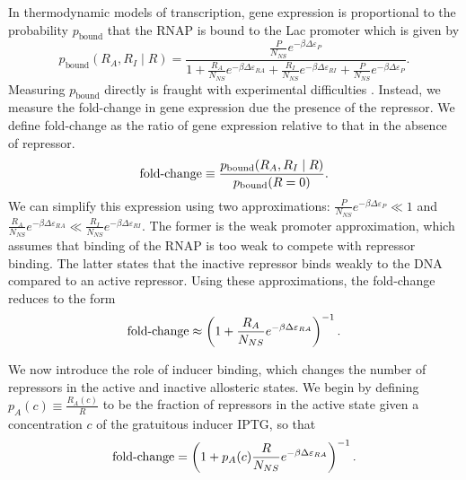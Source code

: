In thermodynamic models of transcription, gene expression is proportional to the probability $p_{\text{bound}}$ that the RNAP is bound to the Lac promoter which is given by
\begin{equation}\label{eq2}
p_{\text{bound}}(R_A, R_I \mid R)=\frac{\frac{P}{N_{NS}}e^{-\beta  \Delta\varepsilon_{P}}}{1+\frac{R_A}{N_{NS}}e^{-\beta \Delta\varepsilon_{RA}}+\frac{R_I}{N_{NS}}e^{-\beta  \Delta\varepsilon_{RI}}+\frac{P}{N_{NS}}e^{-\beta\Delta\varepsilon_{P}}}.
\end{equation}
Measuring $p_{\text{bound}}$ directly is fraught with experimental difficulties
\cite{Bintu2005}. Instead, we measure the fold-change in gene expression due the presence of the repressor. We define fold-change as the ratio of gene
expression relative to that in the absence of repressor.
\begin{equation}\label{eq3}
\operatorname{fold-change}\equiv \frac{p_{\text{bound}}(R_A, R_I \mid R)}{p_{\text{bound}}(R = 0)}.
\end{equation}
We can simplify this expression using two approximations:
$\frac{P}{N_{NS}}e^{-\beta\Delta\varepsilon_{P}}\ll 1$ and
$\frac{R_A}{N_{NS}}e^{-\beta \Delta\varepsilon_{RA}} \ll \frac{R_I}{N_{NS}}e^{-\beta \Delta\varepsilon_{RI}}$. The former is the weak promoter
approximation, which assumes that binding of the RNAP is too weak to compete with
repressor binding\cite{Brewster2012}.
The latter states that the inactive repressor binds weakly to the
DNA compared to an active repressor. Using these
approximations, the fold-change reduces to the form
\begin{equation}\label{eq4}
\operatorname{fold-change} \approx \left(1+\frac{R_A}{N_{NS}}e^{-\beta  \Delta\varepsilon_{RA}}\right)^{-1}.
\end{equation}

We now introduce the role of inducer binding, which changes the number of
repressors in the active and inactive allosteric states. We begin by defining
$p_A(c) \equiv \frac{R_A(c)}{R}$ to be the fraction of repressors in the
active state given a concentration $c$ of the gratuitous inducer IPTG, so that
\begin{equation}
\operatorname{fold-change} = \left( 1+p_A(c) \frac{R}{N_{NS}}e^{-\beta
	\Delta\varepsilon_{RA}} \right)^{-1}. \label{eq5}
\end{equation}


